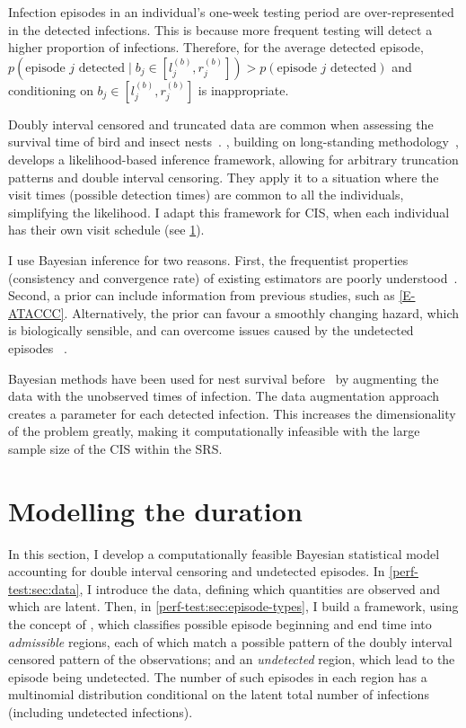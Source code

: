 \documentclass[thesis.tex]{subfiles}
\begin{document}
Infection episodes in an individual's one-week testing period are over-represented in the detected infections.
This is because more frequent testing will detect a higher proportion of infections.
Therefore, for the average detected episode, $p(\text{episode $j$ detected} \mid b_j \in [l_j^{(b)}, r_j^{(b)}]) > p(\text{episode $j$ detected})$ and conditioning on $b_j \in [l_j^{(b)}, r_j^{(b)}]$ is inappropriate.

Doubly interval censored and truncated data are common when assessing the survival time of bird and insect nests~\autocite{heiseyABCs}.
\textcite{heiseyModelling}, building on long-standing methodology~\autocite{dempsterMaximum,turnbullEmpirical}, develops a likelihood-based inference framework, allowing for arbitrary truncation patterns and double interval censoring.
They apply it to a situation where the visit times (possible detection times) are common to all the individuals, simplifying the likelihood.
I adapt this framework for CIS, when each individual has their own visit schedule (see \cref{perf-test:sec:model}).

I use Bayesian inference for two reasons.
First, the frequentist properties (\eg consistency and convergence rate) of existing estimators are poorly understood~\autocite{sunAnalysis,dengNonparametric}.
Second, a prior can include information from previous studies, such as \cref{E-ATACCC}.
Alternatively, the prior can favour a smoothly changing hazard, which is biologically sensible, and can overcome issues caused by the undetected episodes ~\autocite{caoBias}.

Bayesian methods have been used for nest survival before~\autocite{heBayesiana,heBayesian,caoModeling} by augmenting the data with the unobserved times of infection.
The data augmentation approach creates a parameter for each detected infection.
This increases the dimensionality of the problem greatly, making it computationally infeasible with the large sample size of the CIS within the SRS.


\section{Modelling the duration}\label{perf-test:sec:model}

In this section, I develop a computationally feasible Bayesian statistical model accounting for double interval censoring and undetected episodes.
In \cref{perf-test:sec:data}, I introduce the data, defining which quantities are observed and which are latent.
Then, in \cref{perf-test:sec:episode-types}, I build a framework, using the concept of \textcite{heiseyModelling}, which classifies possible episode beginning and end time into \emph{admissible} regions, each of which match a possible pattern of the doubly interval censored pattern of the observations; and an \emph{undetected} region, which lead to the episode being undetected.
The number of such episodes in each region has a multinomial distribution conditional on the latent total number of infections (including undetected infections).
\end{document}
